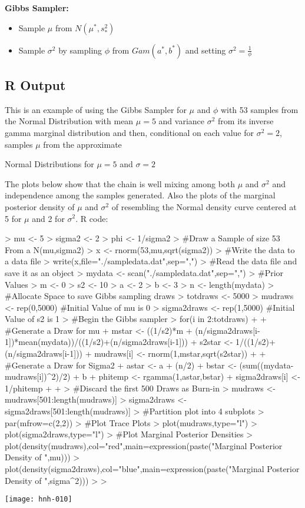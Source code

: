 \documentclass[11pt,a4paper]{article}
\theoremstyle{plain}
\begin{document}
{\bf Gibbs Sampler:}
\begin{itemize}
  \item Sample $\mu$ from $N(\mu^*,s_*^2)$
  \item Sample $\sigma^2$ by sampling $\phi$ from $Gam(a^*,b^*)$ and setting $\sigma^2=\frac{1}{\phi}$
\end{itemize}

\newpage 
\subsection*{R Output}
This is an example of using the Gibbs Sampler for $\mu$ and $\phi$ with 53 samples from the Normal Distribution with mean $\mu=5$ and variance $\sigma^2$ from its inverse gamma marginal distribution and then, conditional on each value for $\sigma^2=2$, samples $\mu$ from the approximate
\begin{center}
Normal Distributions for $\mu=5$ and $\sigma=2$ 
\end{center}
The plots below show that the chain is well mixing among both $\mu$ and $\sigma^2$ and independence among the samples generated. Also the plots of the marginal posterior density of $\mu$ and $\sigma^2$ of resembling the Normal density curve centered at 5 for $\mu$ and 2 for $\sigma^2$.
\newline R code:
\begin{Schunk}
\begin{Sinput}
> mu <- 5
> sigma2 <- 2
> phi <- 1/sigma2
> #Draw a Sample of size 53 From a N(mu,sigma2)
> x <- rnorm(53,mu,sqrt(sigma2))
> #Write the data to a data file
> write(x,file="./sampledata.dat",sep=",")
> #Read the data file and save it as an object
> mydata <- scan("./sampledata.dat",sep=",")
> #Prior Values
> m <- 0
> s2 <- 10
> a <- 2
> b <- 3
> n <- length(mydata)
> #Allocate Space to save Gibbs sampling draws
> totdraws <- 5000
> mudraws <- rep(0,5000) #Initial Value of mu is 0
> sigma2draws <- rep(1,5000) #Initial Value of s2 is 1
> #Begin the Gibbs sampler
> for(i in 2:totdraws){
+   
+   #Generate a Draw for mu
+   mstar <- ((1/s2)*m + (n/sigma2draws[i-1])*mean(mydata))/((1/s2)+(n/sigma2draws[i-1]))
+   s2star <- 1/((1/s2)+(n/sigma2draws[i-1]))
+   mudraws[i] <- rnorm(1,mstar,sqrt(s2star))
+   
+   #Generate a Draw for Sigma2
+   astar <- a + (n/2)
+   bstar <- (sum((mydata-mudraws[i])^2)/2) + b
+   phitemp <- rgamma(1,astar,bstar)
+   sigma2draws[i] <- 1/phitemp
+   
+ }
> #Discard the first 500 Draws as Burn-in
> mudraws <- mudraws[501:length(mudraws)]
> sigma2draws <- sigma2draws[501:length(mudraws)]
> #Partition plot into 4 subplots
> par(mfrow=c(2,2))
> #Plot Trace Plots
> plot(mudraws,type="l")
> plot(sigma2draws,type="l")
> #Plot Marginal Posterior Densities
> plot(density(mudraws),col="red",main=expression(paste("Marginal Posterior Density of ",mu)))
> plot(density(sigma2draws),col="blue",main=expression(paste("Marginal Posterior Density of ",sigma^2)))
> 
> 
\end{Sinput}
\end{Schunk}
\texttt{[image: hnh-010]}
\end{document}
